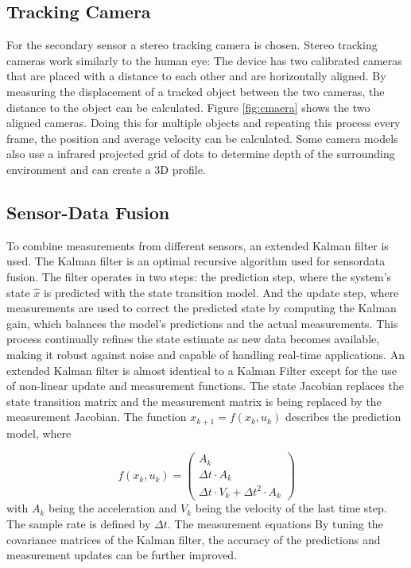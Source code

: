 \documentclass[engproc,conferenceproceedings,submit,pdftex,moreauthors]{Definitions/mdpi}
\begin{document}
 \subsection{Tracking Camera}
 For the secondary sensor a stereo tracking camera is chosen. Stereo tracking cameras work similarly to the human eye: The device has two calibrated cameras that are placed with a distance to each other and are horizontally aligned. By measuring the displacement of a tracked object between the two cameras, the distance to the object can be calculated. Figure \ref{fig:cmaera} shows the two aligned cameras.
 Doing this for multiple objects and repeating this process every frame, the position and average velocity can be calculated.
 Some camera models also use a infrared projected grid of dots to determine depth of the surrounding environment and can create a 3D profile.
 
 
\subsection{Sensor-Data Fusion}
To combine measurements from different sensors, an extended Kalman filter is used. The Kalman filter is an optimal recursive algorithm used for sensordata fusion. The filter operates in two steps: the prediction step, where the system's state $\hat{x}$ is predicted with the state transition model. And the update step, where measurements are used to correct the predicted state by computing the Kalman gain, which balances the model's predictions and the actual measurements. This process continually refines the state estimate as new data becomes available, making it robust against noise and capable of handling real-time applications. An extended Kalman filter  is almost identical to a Kalman Filter except for the use of non-linear update and measurement functions. The state Jacobian replaces the state transition matrix and  the measurement matrix is being replaced by the measurement Jacobian. The function  $x_{k+1} = f(x_{k},u_k)$ describes the prediction model, where

\begin{equation}
	f(x_{k},u_k) = \begin{pmatrix}
		A_k \\
		\Delta t \cdot A_k \\
		\Delta t \cdot V_k + \Delta t^2 \cdot A_k
		
		\end{pmatrix}
\end{equation}
with $A_k$ being the acceleration and $V_k$ being the velocity of the last time step. The sample rate is defined by $\Delta t$. The measurement equations 
By tuning the covariance matrices of the Kalman filter, the accuracy of the predictions and measurement updates can be further improved.\\
\end{document}
